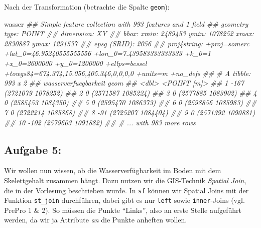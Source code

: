 \documentclass[]{book}
\newenvironment{Shaded}{\begin{snugshade}}{\end{snugshade}}
\newcommand{\CommentTok}[1]{\textcolor[rgb]{0.56,0.35,0.01}{\textit{#1}}}
\newcommand{\NormalTok}[1]{#1}
\begin{document}
Nach der Transformation (betrachte die Spalte \texttt{geom}):

\begin{Shaded}
\begin{Highlighting}[]
\NormalTok{wasser}
\CommentTok{## Simple feature collection with 993 features and 1 field}
\CommentTok{## geometry type:  POINT}
\CommentTok{## dimension:      XY}
\CommentTok{## bbox:           xmin: 2489453 ymin: 1078252 xmax: 2830887 ymax: 1291537}
\CommentTok{## epsg (SRID):    2056}
\CommentTok{## proj4string:    +proj=somerc +lat_0=46.95240555555556 +lon_0=7.439583333333333 +k_0=1 +x_0=2600000 +y_0=1200000 +ellps=bessel +towgs84=674.374,15.056,405.346,0,0,0,0 +units=m +no_defs}
\CommentTok{## # A tibble: 993 x 2}
\CommentTok{##    wasserverfuegbarkeit              geom}
\CommentTok{##                   <dbl>       <POINT [m]>}
\CommentTok{##  1                 -167 (2721079 1078252)}
\CommentTok{##  2                    0 (2571587 1085224)}
\CommentTok{##  3                    0 (2577885 1083902)}
\CommentTok{##  4                    0 (2585453 1084350)}
\CommentTok{##  5                    0 (2595470 1086373)}
\CommentTok{##  6                    0 (2598856 1085983)}
\CommentTok{##  7                    0 (2722214 1085868)}
\CommentTok{##  8                  -91 (2725207 1084404)}
\CommentTok{##  9                    0 (2571392 1090881)}
\CommentTok{## 10                 -102 (2579603 1091882)}
\CommentTok{## # ... with 983 more rows}
\end{Highlighting}
\end{Shaded}

\hypertarget{aufgabe-5}{%
\subsection{Aufgabe 5:}\label{aufgabe-5}}

Wir wollen nun wissen, ob die Wasserverfügbarkeit im Boden mit dem Skelettgehalt zusammen hängt. Dazu nutzen wir die GIS-Technik \emph{Spatial Join}, die in der Vorlesung beschrieben wurde. In \texttt{sf} können wir Spatial Joins mit der Funktion \texttt{st\_join} durchführen, dabei gibt es nur \texttt{left} sowie \texttt{inner}-Joins (vgl. PrePro 1 \& 2). So müssen die Punkte ``Links'', also an erste Stelle aufgeführt werden, da wir ja Attribute \emph{an} die Punkte anheften wollen.
\end{document}
